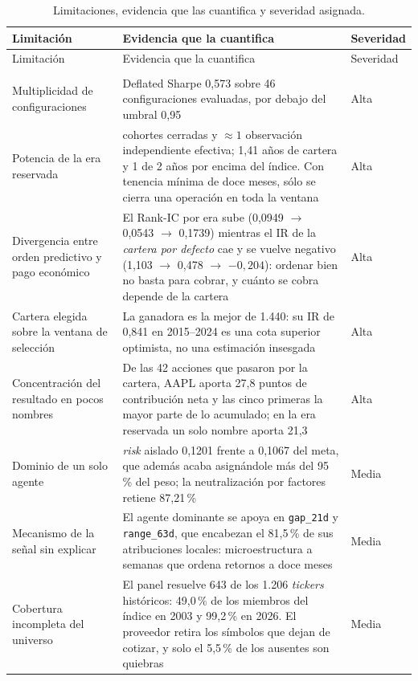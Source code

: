 \begin{longtable}{@{}>{\raggedright\arraybackslash}p{4.6cm}>{\raggedright\arraybackslash}p{9.0cm}l@{}}
\caption{Limitaciones, evidencia que las cuantifica y severidad asignada.}\label{tab:limitaciones}\\
\toprule
Limitación & Evidencia que la cuantifica & Severidad \\
\midrule
\endfirsthead
\toprule
Limitación & Evidencia que la cuantifica & Severidad \\
\midrule
\endhead
\midrule
\multicolumn{3}{r}{\footnotesize Continúa en la página siguiente}\\
\endfoot
\bottomrule
\endlastfoot
Multiplicidad de configuraciones &
Deflated Sharpe 0,573 sobre 46 configuraciones evaluadas, por debajo del umbral 0,95 &
Alta \\
\addlinespace
Potencia de la era reservada &
6 cohortes cerradas y $\approx 1$ observación independiente efectiva; 1,41 años de cartera y 1 de
2 años por encima del índice. Con tenencia mínima de doce meses, sólo se cierra una
operación en toda la ventana &
Alta \\
\addlinespace
Divergencia entre orden predictivo y pago económico &
El Rank-IC por era sube (0,0949 $\to$ 0,0543 $\to$ 0,1739) mientras el IR de la \emph{cartera por
defecto} cae y se vuelve negativo (1,103 $\to$ 0,478 $\to$ $-0{,}204$): ordenar bien no basta para
cobrar, y cuánto se cobra depende de la cartera &
Alta \\
\addlinespace
Cartera elegida sobre la ventana de selección &
La ganadora es la mejor de 1.440: su IR de 0,841 en 2015--2024 es una cota superior optimista, no
una estimación insesgada &
Alta \\
\addlinespace
Concentración del resultado en pocos nombres &
De las 42 acciones que pasaron por la cartera, AAPL aporta 27,8 puntos de contribución neta y las
cinco primeras la mayor parte de lo acumulado; en la era reservada un solo nombre aporta 21,3 &
Alta \\
\addlinespace
Dominio de un solo agente &
\textit{risk} aislado 0,1201 frente a 0,1067 del meta, que además acaba asignándole más del
95\,\% del peso; la neutralización por factores retiene 87,21\,\% &
Media \\
\addlinespace
Mecanismo de la señal sin explicar &
El agente dominante se apoya en \texttt{gap\_21d} y \texttt{range\_63d}, que encabezan el
81,5\,\% de sus atribuciones locales: microestructura a semanas que ordena retornos a doce meses &
Media \\
\addlinespace
Cobertura incompleta del universo &
El panel resuelve 643 de los 1.206 \textit{tickers} históricos: 49,0\,\% de los miembros del índice
en 2003 y 99,2\,\% en 2026. El proveedor retira los símbolos que dejan de cotizar, y solo el
5,5\,\% de los ausentes son quiebras &
Media \\
\end{longtable}
